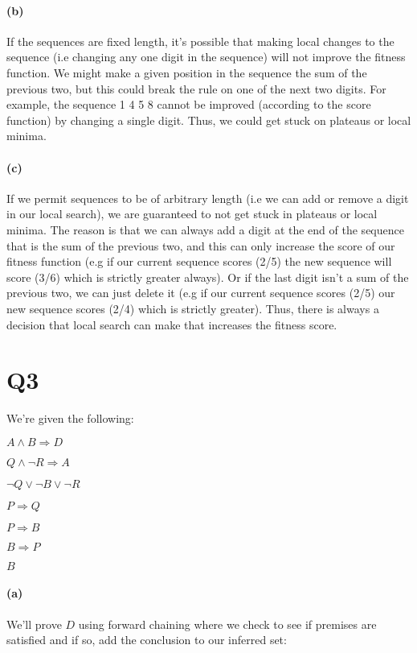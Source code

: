 \documentclass[11pt,a4paper]{article}
\begin{document}
\paragraph*{(b)}
If the sequences are fixed length, it's possible that making local changes to the sequence (i.e changing any one digit in the sequence) will not improve the fitness function. We might make a given position in the sequence the sum of the previous two, but this could break the rule on one of the next two digits. For example, the sequence 1 4 5 8 cannot be improved (according to the score function) by changing a single digit. Thus, we could get stuck on plateaus or local minima. 

\paragraph*{(c)}
If we permit sequences to be of arbitrary length (i.e we can add or remove a digit in our local search), we are guaranteed to not get stuck in plateaus or local minima. The reason is that we can always add a digit at the end of the sequence that is the sum of the previous two, and this can only increase the score of our fitness function (e.g if our current sequence scores (2/5) the new sequence will score (3/6) which is strictly greater always). Or if the last digit isn't a sum of the previous two, we can just delete it (e.g if our current sequence scores (2/5) our new sequence scores (2/4) which is strictly greater). Thus, there is always a decision that local search can make that increases the fitness score.

\section*{Q3}

We're given the following:

$A \wedge B \Rightarrow D$

$Q \wedge \neg R \Rightarrow A$

$\neg Q \vee \neg B \vee \neg R$

$P \Rightarrow Q$

$P \Rightarrow B$

$B \Rightarrow P$

$B$
\paragraph*{(a)}

We'll prove $D$ using forward chaining where we check to see if premises are satisfied and if so, add the conclusion to our inferred set:
\end{document}
